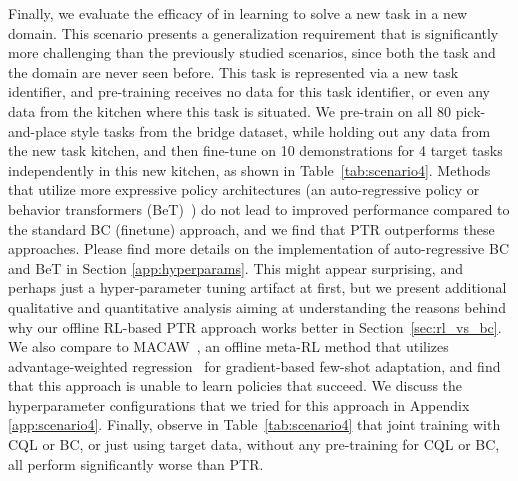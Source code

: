 
\noindent Finally, we evaluate the efficacy of \ptrmethodname in learning to solve a new task in a new domain. 
This scenario presents a generalization requirement that is significantly more challenging than the previously studied scenarios, since both the task and the domain are never seen before. This task is represented via a new task identifier, and pre-training receives no data for this task identifier, or even any data from the kitchen where this task is situated. We pre-train on all 80 pick-and-place style tasks from the bridge dataset, while holding out any data from the new task kitchen, and then fine-tune on 10 demonstrations for 4 target tasks independently in this new kitchen, as shown in Table~\ref{tab:scenario4}. 
Methods that utilize more expressive policy architectures (an auto-regressive policy or behavior transformers (BeT)~\citep{shafiullah2022behavior}) do not lead to improved performance compared to the standard BC (finetune) approach, and we find that PTR outperforms these approaches. Please find more details on the implementation of auto-regressive BC and BeT in Section \ref{app:hyperparams}. This might appear surprising, and perhaps just a hyper-parameter tuning artifact at first, but we present additional qualitative and quantitative analysis aiming at understanding the reasons behind why our offline RL-based PTR approach works better in Section~\ref{sec:rl_vs_bc}. We also compare to MACAW~\citep{mitchell2021offline}, an offline meta-RL method that utilizes advantage-weighted regression~\citep{peng2019awr} for gradient-based few-shot adaptation, and find that this approach is unable to learn policies that succeed. We discuss the hyperparameter configurations that we tried for this approach in Appendix \ref{app:scenario4}. Finally, observe in Table~\ref{tab:scenario4} that joint training with CQL or BC, or just using target data, without any pre-training for CQL or BC, all perform significantly worse than PTR.

